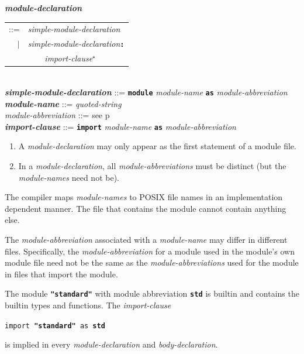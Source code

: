 \documentclass[12pt]{article}
\newcommand{\TT}[1]{{\tt \bfseries #1}}
\newcommand{\STAR}{{\Large $^\star$}}
\newcommand{\ttkey}[1]{{\tt \bfseries #1}}
\newcommand{\emkey}[1]{{\em \bfseries #1}}
\newcommand{\pagref}[1]{p\pageref{#1}}
\newenvironment{indpar}[1][0.3in]%
	{\begin{list}{}%
		     {\setlength{\itemsep}{0in}%
		      \setlength{\topsep}{0in}%
		      \setlength{\parsep}{1ex}%
		      \setlength{\labelwidth}{#1}%
		      \setlength{\leftmargin}{#1}%
		      \addtolength{\leftmargin}{\labelsep}}%
	 \item}%
	{\end{list}}
\begin{document}
\begin{indpar}
\emkey{module-declaration}\label{MODULE-DECLARATION}
    \begin{tabular}[t]{rl}
    ::= & {\em simple-module-declaration} \\
    $|$ & {\em simple-module-declaration}\TT{:} \\
	& \TT{~~~~}{\em import-clause}\STAR{} \\
    \end{tabular} \\
\emkey{simple-module-declaration} ::= \TT{module} {\em module-name}
        \TT{as} {\em module-abbreviation} \\
\emkey{module-name}\label{MODULE-NAME} ::= {\em quoted-string} \\
{\em module-abbreviation} ::= see \pagref{MODULE-ABBREVIATION} \\
\emkey{import-clause}\label{IMPORT-CLAUSE}
    ::= \ttkey{import} {\em module-name} \TT{as} {\em module-abbreviation}

\begin{enumerate}

\item
A {\em module-declaration} may only appear as the first statement
of a module file.

\item
In a {\em module-declaration}, all {\em module-abbreviations} must be
distinct (but the {\em module-names} need not be).
\end{enumerate}
\end{indpar}

The compiler maps {\em module-names} to POSIX file names in an
implementation dependent manner.  The file that contains the
module cannot contain anything else.

The {\em module-abbreviation} associated with a {\em module-name}
may differ in different files.  Specifically, the {\em module-abbreviation}
for a module used in the module's own module file need not be the same
as the {\em module-abbreviations} used for the module in files
that import the module.

The module \TT{"standard"}\index{standard@\TT{"standard"}} with
module abbreviation \ttkey{std} is builtin and contains the builtin types and
functions.  The {\em import-clause}
\begin{center}
{\tt import }\TT{"standard"}{\tt{} as \ttkey{std}}
\end{center}
is implied in every {\em module-declaration} and
{\em body-declaration}.
\end{document}
